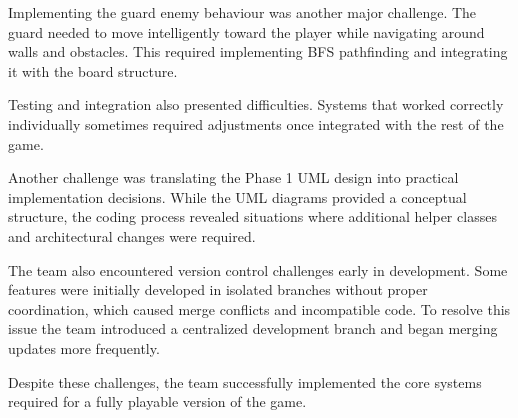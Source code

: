 \documentclass[12pt]{article}
\begin{document}
Implementing the guard enemy behaviour was another major challenge. The guard needed to move intelligently toward the player while navigating around walls and obstacles. This required implementing BFS pathfinding and integrating it with the board structure.

Testing and integration also presented difficulties. Systems that worked correctly individually sometimes required adjustments once integrated with the rest of the game.

Another challenge was translating the Phase 1 UML design into practical implementation decisions. While the UML diagrams provided a conceptual structure, the coding process revealed situations where additional helper classes and architectural changes were required.

The team also encountered version control challenges early in development. Some features were initially developed in isolated branches without proper coordination, which caused merge conflicts and incompatible code. To resolve this issue the team introduced a centralized development branch and began merging updates more frequently.

Despite these challenges, the team successfully implemented the core systems required for a fully playable version of the game.

\end{document}
